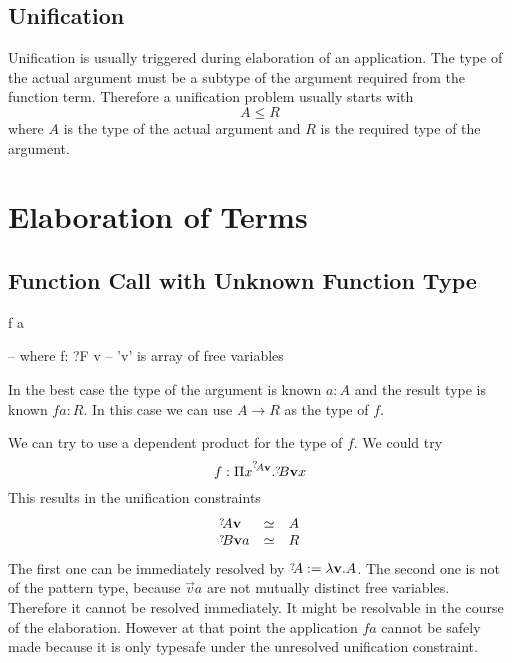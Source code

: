 \subsection{Unification}

Unification is usually triggered during elaboration of an application. The type
of the actual argument must be a subtype of the argument required from the
function term. Therefore a unification problem usually starts with
$$
    A \le R
$$
where $A$ is the type of the actual argument and $R$ is the required type of the
argument.















\section{Elaboration of Terms}





\subsection{Function Call with Unknown Function Type}


\begin{alba}
    f a

    -- where
    f: ?F v     -- 'v' is array of free variables
\end{alba}

In the best case the type of the argument is known $a: A$ and the result type is
known $f a: R$. In this case we can use $A \to R$ as the type of $f$.

We can try to use a dependent product for the type of $f$. We could try
$$
    f: \Pi x^{\meta{A} \vec{v}}. \meta{B} \vec{v}x
$$
%
This results in the unification constraints
$$
\begin{array}{lll}
    \meta{A} \vec{v}
    &\unify&
    A

    \\

    \meta{B} \vec{v} a
    &\unify&
    R
\end{array}
$$
%
The first one can be immediately resolved by $\meta{A} := \lambda \vec{v}. A$.
The second one is not of the pattern type, because $\vec{v} a$ are not mutually
distinct free variables. Therefore it cannot be resolved immediately. It might
be resolvable in the course of the elaboration. However at that point the
application $f a$ cannot be safely made because it is only typesafe under the
unresolved unification constraint.




